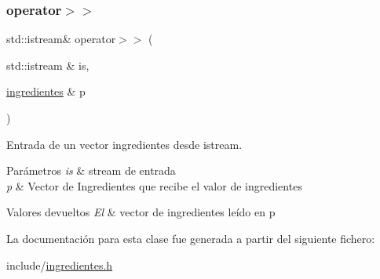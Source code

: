 \subsubsection{\texorpdfstring{operator$>$$>$}{operator>>}}
{\footnotesize\ttfamily std\+::istream\& operator$>$$>$ (\begin{DoxyParamCaption}\item[{std\+::istream \&}]{is,  }\item[{\hyperlink{classingredientes}{ingredientes} \&}]{p }\end{DoxyParamCaption})\hspace{0.3cm}{\ttfamily [friend]}}



Entrada de un vector ingredientes desde istream. 


\begin{DoxyParams}{Parámetros}
{\em is} & stream de entrada \\
\hline
{\em p} & Vector de Ingredientes que recibe el valor de ingredientes \\
\hline
\end{DoxyParams}

\begin{DoxyRetVals}{Valores devueltos}
{\em El} & vector de ingredientes leído en p \\
\hline
\end{DoxyRetVals}


La documentación para esta clase fue generada a partir del siguiente fichero\+:\begin{DoxyCompactItemize}
\item 
include/\hyperlink{ingredientes_8h}{ingredientes.\+h}\end{DoxyCompactItemize}
